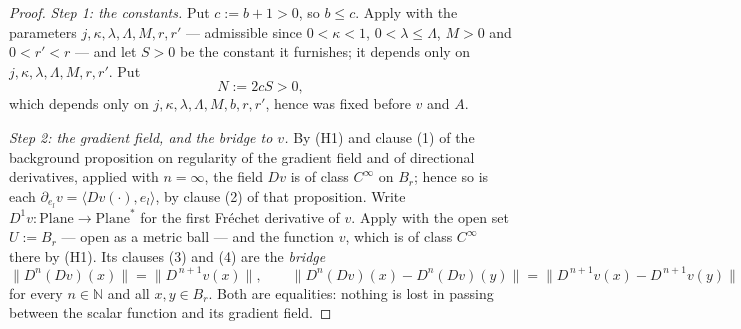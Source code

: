 \begin{proof}
\medskip\noindent\emph{Step 1: the constants.}
Put $c:=b+1>0$, so $b\le c$.  Apply  with the parameters
$j,\kappa,\lambda,\Lambda,M,r,r'$ --- admissible since $0<\kappa<1$, $0<\lambda\le\Lambda$,
$M>0$ and $0<r'<r$ --- and let $S>0$ be the constant it furnishes; it depends only on
$j,\kappa,\lambda,\Lambda,M,r,r'$.  Put
\[
  N:=2cS>0 ,
\]
which depends only on $j,\kappa,\lambda,\Lambda,M,b,r,r'$, hence was fixed before $v$ and $A$.

\medskip\noindent\emph{Step 2: the gradient field, and the bridge to $v$.}
By (H1) and clause (1) of the background proposition on regularity of the gradient field and of
directional derivatives, applied with $n=\infty$, the field $Dv$ is of class $C^{\infty}$ on
$B_r$; hence so is each $\partial_{e_l}v=\langle Dv(\cdot),e_l\rangle$, by clause (2) of that
proposition.  Write $D^{1}v\colon\mathrm{Plane}\to\mathrm{Plane}^{*}$ for the first Fr\'echet
derivative of $v$.  Apply  with the open set $U:=B_r$ --- open
as a metric ball --- and the function $v$, which is of class $C^{\infty}$ there by (H1).  Its
clauses (3) and (4) are the \emph{bridge}
\begin{equation}\label{eq:br-bridge}
  \bigl\lVert D^{n}(Dv)(x)\bigr\rVert=\bigl\lVert D^{\,n+1}v(x)\bigr\rVert,
  \qquad
  \bigl\lVert D^{n}(Dv)(x)-D^{n}(Dv)(y)\bigr\rVert
    =\bigl\lVert D^{\,n+1}v(x)-D^{\,n+1}v(y)\bigr\rVert
\end{equation}
for every $n\in\mathbb{N}$ and all $x,y\in B_r$.  Both are equalities: nothing is lost in passing
between the scalar function and its gradient field.


\end{proof}
